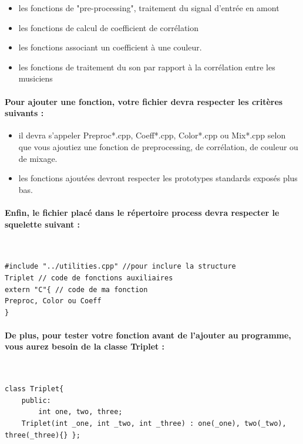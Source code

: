 \documentclass[a4paper]{article}
\begin{document}
\begin{itemize} \item les fonctions de "pre-processing", traitement du signal
d’entrée en amont \item les fonctions de calcul de coefficient de corrélation
\item les fonctions associant un coefficient à une couleur. \item les fonctions
de traitement du son par rapport à la corrélation entre les musiciens
\end{itemize}

\paragraph{Pour ajouter une fonction, votre fichier devra respecter les critères
suivants :}

\begin{itemize} \item il devra s’appeler Preproc*.cpp, Coeff*.cpp, Color*.cpp ou
Mix*.cpp selon que vous ajoutiez une fonction de preprocessing, de corrélation,
de couleur ou de mixage. \item les fonctions ajoutées devront respecter les
prototypes standards exposés plus bas. \end{itemize}

\paragraph{Enfin, le fichier placé dans le répertoire process devra respecter le
squelette suivant :}
\

\begin{lstlisting}
#include "../utilities.cpp" //pour inclure la structure
Triplet // code de fonctions auxiliaires
extern "C"{ // code de ma fonction
Preproc, Color ou Coeff
}
\end{lstlisting}

\paragraph{De plus, pour tester votre fonction avant de l’ajouter au programme,
vous aurez besoin de la classe Triplet :}
\

\begin{lstlisting}
class Triplet{
	public:
		int one, two, three;
	Triplet(int _one, int _two, int _three) : one(_one), two(_two), three(_three){} };
\end{lstlisting}
\end{document}
